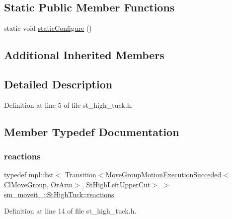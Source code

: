 \subsection*{Static Public Member Functions}
\begin{DoxyCompactItemize}
\item 
static void \hyperlink{structsm__moveit__3_1_1StHighTuck_aec8c3461ff25307361fed9e292e2a00d}{static\+Configure} ()
\end{DoxyCompactItemize}
\subsection*{Additional Inherited Members}


\subsection{Detailed Description}


Definition at line 5 of file st\+\_\+high\+\_\+tuck.\+h.



\subsection{Member Typedef Documentation}
\mbox{\label{structsm__moveit__3_1_1StHighTuck_aa368fa2efc361892c3130c432790d16e}} 
\subsubsection{\texorpdfstring{reactions}{reactions}}
{\footnotesize\ttfamily typedef mpl\+::list$<$ Transition$<$\hyperlink{structmoveit__z__client_1_1MoveGroupMotionExecutionSucceded}{Move\+Group\+Motion\+Execution\+Succeded}$<$\hyperlink{classmoveit__z__client_1_1ClMoveGroup}{Cl\+Move\+Group}, \hyperlink{classsm__moveit__3_1_1OrArm}{Or\+Arm}$>$, \hyperlink{structsm__moveit__3_1_1StHighLeftUpperCut}{St\+High\+Left\+Upper\+Cut}$>$ $>$ \hyperlink{structsm__moveit__3_1_1StHighTuck_aa368fa2efc361892c3130c432790d16e}{sm\+\_\+moveit\+\_\+::\+St\+High\+Tuck\+::reactions}}



Definition at line 14 of file st\+\_\+high\+\_\+tuck.\+h.



